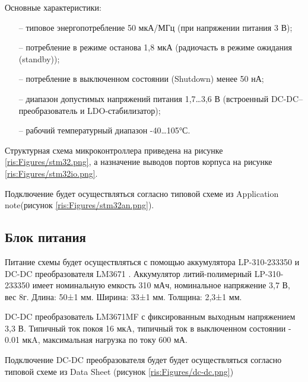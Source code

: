 \begin{sloppypar}
Основные характеристики:
\begin{onehalfspace}
	\begin{itemize}
		\item[--] типовое энергопотребление 50 мкА/МГц (при напряжении питания 3 В);
		\item[--] потребление в режиме останова 1,8 мкА (радиочасть в режиме ожидания (standby));
		\item[--] потребление в выключенном состоянии (Shutdown) менее 50 нА;
		\item[--] диапазон допустимых напряжений питания 1,7…3,6 В (встроенный DC-DC–преобразователь и LDO-стабилизатор);
		\item[--] рабочий температурный диапазон -40…105°С.
	\end{itemize}
\end{onehalfspace}


Структурная схема микроконтроллера приведена на рисунке \ref{ris:Figures/stm32.png}, а назначение выводов портов корпуса на рисунке \ref{ris:Figures/stm32io.png}.





Подключение будет осуществляться согласно типовой схеме из Application note\cite {STM_an}(рисунок \ref{ris:Figures/stm32an.png}).







 











\subsection{Блок питания}
Питание схемы будет осуществляться с помощью аккумулятора LP-310-233350 \cite {li-pol}  и DC-DC преобразователя LM3671 \cite {dc-dc}.
Аккумулятор литий-полимерный LP-310-233350 имеет номинальную емкость 310 мАч, номинальное напряжение 3,7 В, вес 8г. Длина: 50±1 мм. Ширина: 33±1 мм. Толщина: 2,3±1 мм. 


DC-DC преобразователь LM3671MF с фиксированным выходным напряжением 3,3 В. Типичный ток покоя 16 мкA, типичный ток в выключенном состоянии - 0.01 мкA, максимальная нагрузка по току 600 мА.

Подключение DC-DC преобразователя будет будет осуществляться согласно типовой схеме из Data Sheet \cite {dc-dc} (рисунок \ref{ris:Figures/dc-dc.png})





\end{sloppypar}
